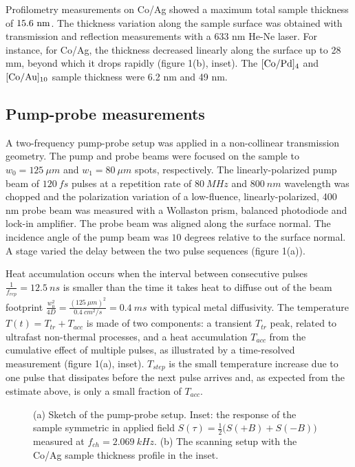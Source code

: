 \documentclass[5p]{elsarticle}
\begin{document}
Profilometry measurements on Co/Ag showed a maximum total sample thickness of $\rm 15.6~nm$. The thickness variation along the sample surface was obtained with transmission and reflection measurements with a 633 nm He-Ne laser. For instance, for Co/Ag, the thickness decreased linearly along the surface up to 28 mm, beyond which it drops rapidly (figure 1(b), inset). The $\rm [Co/Pd]_{4}$ and $\rm [Co/Au]_{10}$ sample thickness were 6.2 nm and 49 nm.

\subsection{Pump-probe measurements}

A two-frequency pump-probe setup was applied in a non-collinear transmission geometry. The pump and probe beams were focused on the sample to $w_{0}=125~\mu m$ and $w_{1}=80~\mu m$ spots, respectively. The linearly-polarized pump beam of $120~fs$ pulses at a repetition rate of $80~MHz$ and $800~nm$ wavelength was chopped and the polarization variation of a low-fluence, linearly-polarized, 400 nm probe beam was measured with a Wollaston prism, balanced photodiode and lock-in amplifier. The probe beam was aligned along the surface normal. The incidence angle of the pump beam was $10$ degrees relative to the surface normal. A stage varied the delay between the two pulse sequences (figure 1(a)).

Heat accumulation occurs when the interval between consecutive pulses $\frac{1}{f_{rep}}=12.5~ns$ is smaller than the time it takes heat to diffuse out of the beam footprint $\frac{w_{0}^{2}}{4D} = \frac{(125~\mu m)^{2}}{0.4~cm^{2}/s} = 0.4~ms$ with typical metal diffusivity. The temperature $T(t)=T_{tr}+T_{acc}$ is made of two components: a transient $T_{tr}$ peak, related to ultrafast non-thermal processes, and a heat accumulation $T_{acc}$ from the cumulative effect of multiple pulses, as illustrated by a time-resolved measurement (figure 1(a), inset). $T_{step}$ is the small temperature increase due to one pulse that dissipates before the next pulse arrives and, as expected from the estimate above, is only a small fraction of $T_{acc}$.

\begin{figure}
\centering{}
\caption{\label{fig:Figure1} (a) Sketch of the pump-probe setup. Inset: the response of the sample symmetric in applied field $S(\tau)=\frac{1}{2}\Big( S(+B)+S(-B) \Big)$ measured at $f_{ch}=2.069~kHz$. (b) The scanning setup with the Co/Ag sample thickness profile in the inset.}
\end{figure}
\end{document}
